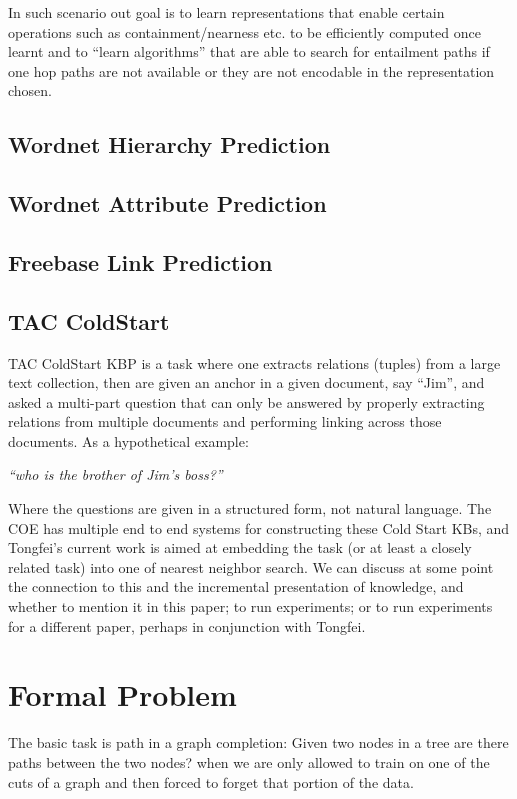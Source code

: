 \documentclass[11pt]{article}
\begin{document}
In such scenario out goal is to learn representations that enable
certain operations such as containment/nearness etc. to be efficiently
computed once learnt and to ``learn algorithms'' that are able to
search for entailment paths if one hop paths are not available or they
are not encodable in the representation chosen.

\subsection{Wordnet Hierarchy Prediction}
\label{sec:wordn-hier-pred}


\subsection{Wordnet Attribute Prediction}
\label{sec:wordn-attr-pred}



\subsection{Freebase Link Prediction}
\label{sec:freeb-link-pred}

\subsection{TAC ColdStart}
\label{sec:coldstart}

TAC ColdStart KBP is a task where one extracts relations (tuples) from
a large text collection, then are given an anchor in a given document,
say ``Jim'', and asked a multi-part question that can only be answered
by properly extracting relations from multiple documents and
performing linking across those documents.  As a hypothetical example:

\emph{``who is the brother of Jim's boss?''}

Where the questions are given in a structured form, not natural
language.  The COE has multiple end to end systems for constructing
these Cold Start KBs, and Tongfei's current work is aimed at embedding
the task (or at least a closely related task) into one of nearest
neighbor search.  We can discuss at some point the connection to this
and the incremental presentation of knowledge, and whether to mention
it in this paper; to run experiments; or to run experiments for a
different paper, perhaps in conjunction with Tongfei.

\section{Formal Problem}
\label{sec:formal-problem}
The basic task is path in a graph completion: Given two nodes in a
tree are there paths between the two nodes? when we are only allowed
to train on one of the cuts of a graph and then forced to forget that
portion of the data.
\end{document}
